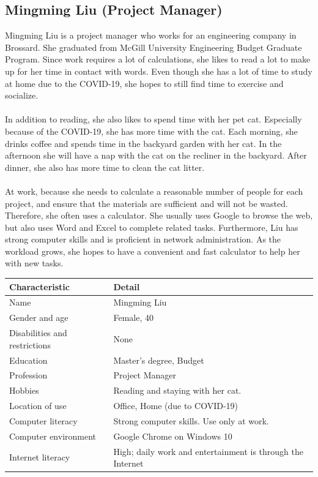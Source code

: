 \documentclass[11pt,onside]{report}
\begin{document}
\subsection{Mingming Liu (Project Manager)}
\begin{description}
Mingming Liu is a project manager who works for an engineering company in Brossard. She graduated from McGill University Engineering Budget Graduate Program. Since work requires a lot of calculations, she likes to read a lot to make up for her time in contact with words. Even though she has a lot of time to study at home due to the COVID-19, she hopes to still find time to exercise and socialize. \\ \\

In addition to reading, she also likes to spend time with her pet cat. Especially because of the COVID-19, she has more time with the cat. Each morning, she drinks coffee and spends time in the backyard garden with her cat. In the afternoon she will have a nap with the cat on the recliner in the backyard. After dinner, she also has more time to clean the cat litter. \\ \\

At work, because she needs to calculate a reasonable number of people for each project, and ensure that the materials are sufficient and will not be wasted. Therefore, she often uses a calculator. She usually uses Google to browse the web, but also uses Word and Excel to complete related tasks. Furthermore, Liu has strong computer skills and is proficient in network administration. As the workload grows, she hopes to have a convenient and fast calculator to help her with new tasks.
\end{description}
\begin{center}
    \begin{tabular}{|p{4cm}|p{10cm}|}
        \hline
        \bf{Characteristic} & \bf{Detail} \\
        \hline
        Name &   Mingming Liu \\
        \hline
        Gender and age & Female, 40 \\
        \hline
        Disabilities and restrictions &  None \\
        \hline
        Education & Master's degree, Budget \\
        \hline
        Profession & Project Manager \\
        \hline
        Hobbies & Reading and staying with her cat. \\
        \hline
        Location of use & Office, Home (due to COVID-19) \\
        \hline
        Computer literacy &  Strong computer skills. Use only at work. \\
        \hline
        Computer environment &  Google Chrome on Windows 10 \\
        \hline
        Internet literacy &  High; daily work and entertainment is through the Internet \\
        \hline
    \end{tabular}
\end{center}
\end{document}

